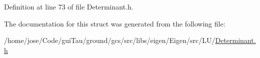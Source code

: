Definition at line 73 of file Determinant.\-h.



The documentation for this struct was generated from the following file\-:\begin{DoxyCompactItemize}
\item 
/home/jose/\-Code/gui\-Tau/ground/gcs/src/libs/eigen/\-Eigen/src/\-L\-U/\hyperlink{_determinant_8h}{Determinant.\-h}\end{DoxyCompactItemize}
